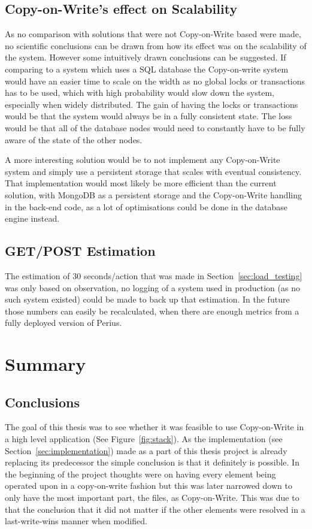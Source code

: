\documentclass[a4paper,12pt]{article}
\begin{document}
\subsection{Copy-on-Write's effect on Scalability}
As no comparison with solutions that were not Copy-on-Write based were made, no scientific
conclusions can be drawn from how its effect was on the scalability of the system. However some
intuitively drawn conclusions can be suggested. If comparing to a system which uses a SQL database
the Copy-on-write system would have an easier time to scale on the width as no global locks or 
transactions has to be used, which with high probability would slow down the system, especially 
when widely distributed. 
The gain of having the locks or transactions would be that the system would always be
in a fully consistent state. The loss would be that all of the database nodes would need to 
constantly have to be fully aware of the state of the other nodes. 

\par A more interesting solution would be to not implement any Copy-on-Write system and simply use 
a persistent storage that scales with eventual consistency. That implementation would most likely be
more efficient than the current solution, with MongoDB as a persistent storage and the Copy-on-Write
handling in the back-end code, as a lot of optimisations could be done in the database engine
instead.

\subsection{GET/POST Estimation}
The estimation of 30 seconds/action that was made in Section~\ref{sec:load_testing} was only based
on observation, no logging of a system used in production (as no such system existed) could be made 
to back up that estimation. In the future those numbers can easily be recalculated, when there are
enough metrics from a fully deployed version of Perius.

\newpage
\section{Summary}
\subsection{Conclusions}
The goal of this thesis was to see whether it was feasible to use Copy-on-Write in a high level
application (See Figure~\ref{fig:stack}). As the implementation (see
Section~\ref{sec:implementation}) made as a part of this thesis project is already replacing its
predecessor the simple conclusion is that it definitely is possible. In the beginning of the project
thoughts were on having every element being operated upon in a copy-on-write fashion but this was
later narrowed down to only have the most important part, the files, as Copy-on-Write. This was due
to that the conclusion that it did not matter if the other elements were resolved in a
last-write-wins manner when modified.
\end{document}
